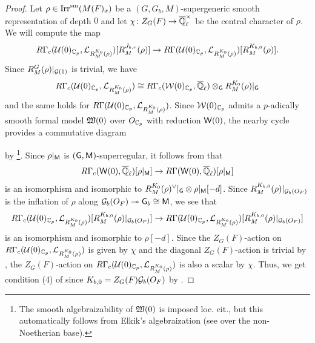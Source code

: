 \documentclass[12pt,reqno]{amsart}
\begin{document}
\begin{proof}
    Let $\rho \in {\operatorname{Irr}}^{\operatorname{sm}}(M(F)_x)$ be a $(G, G_b, M)$-supergeneric smooth representation of depth $0$ and let $\chi \colon Z_G(F) \to {\overline{\mathbb{Q}}_\ell^\times}$ be the central character of $\rho$. We will compute the map 
    \[
        R\Gamma_c({\mathcal{U}}(0)_{\mathbb{C}_p}, {\mathcal{L}}_{R^{K_0}_M(\rho)})[R^{J_{b, r}}_M(\rho)] \to R\Gamma({\mathcal{U}}(0)_{\mathbb{C}_p}, {\mathcal{L}}_{R^{K_0}_M(\rho)})[R^{K_{b, 0}}_M(\rho)]. 
    \]
    Since $R_M^G(\rho) \vert_{{\mathcal{G}}(1)}$ is trivial, we have 
    \[
        R\Gamma_c({\mathcal{U}}(0)_{\mathbb{C}_p}, {\mathcal{L}}_{R^{K_0}_M(\rho)}) \cong R\Gamma_c({\mathcal{W}}(0)_{\mathbb{C}_p}, {\overline{\mathbb{Q}}_\ell}) \otimes_{{\mathsf{G}}} R^{K_0}_M(\rho)\vert_{{\mathsf{G}}} 
    \]
    and the same holds for $R\Gamma({\mathcal{U}}(0)_{\mathbb{C}_p}, {\mathcal{L}}_{R^{K_0}_M(\rho)})$. Since ${\mathcal{W}}(0)_{\mathbb{C}_p}$ admits a $p$-adically smooth formal model ${\mathfrak{W}}(0)$ over $O_{\mathbb{C}_p}$ with reduction ${\mathsf{W}}(0)$, the nearby cycle provides a commutative diagram
    \begin{center}
    \end{center}
    by \cite[Lemma 4.5]{Tsu16}\footnote{The smooth algebraizability of ${\mathfrak{W}}(0)$ is imposed loc. cit., but this automatically follows from Elkik's algebraization (see \cite[footnote 6]{BS22} over the non-Noetherian base).}. Since $\rho\vert_{{\mathsf{M}}}$ is $({\mathsf{G}}, {\mathsf{M}})$-superregular, it follows from \cite[Théorème 11.7, B']{BR03} that 
    \[
        R\Gamma_c({\mathsf{W}}(0), {\overline{\mathbb{Q}}_\ell})\lbrack \rho\vert_{{\mathsf{M}}} \rbrack \to R\Gamma({\mathsf{W}}(0), {\overline{\mathbb{Q}}_\ell})\lbrack \rho\vert_{{\mathsf{M}}} \rbrack
    \]
    is an isomorphism and isomorphic to $R_M^{K_0}(\rho)^\vee\vert_{{\mathsf{G}}} \otimes \rho\vert_{{\mathsf{M}}}[-d]$. Since $R^{K_{b, 0}}_M(\rho) \vert_{{\mathcal{G}}_b(O_F)}$ is the inflation of $\rho$ along ${\mathcal{G}}_b(O_F) \twoheadrightarrow {\mathsf{G}}_b \cong {\mathsf{M}}$, we see that
    \[
        R\Gamma_c({\mathcal{U}}(0)_{\mathbb{C}_p}, {\mathcal{L}}_{R^{K_0}_M(\rho)})[R^{K_{b, 0}}_M(\rho) \vert_{{\mathcal{G}}_b(O_F)}] \to R\Gamma({\mathcal{U}}(0)_{\mathbb{C}_p}, {\mathcal{L}}_{R^{K_0}_M(\rho)})[R^{K_{b, 0}}_M(\rho) \vert_{{\mathcal{G}}_b(O_F)}]
    \]
    is an isomorphism and isomorphic to $\rho[-d]$. Since the $Z_G(F)$-action on $R\Gamma_c({\mathcal{U}}(0)_{\mathbb{C}_p}, {\mathcal{L}}_{R^{K_0}_M(\rho)})$ is given by $\chi$ and the diagonal $Z_G(F)$-action is trivial by , the $Z_G(F)$-action on $R\Gamma_c({\mathcal{U}}(0)_{\mathbb{C}_p}, {\mathcal{L}}_{R^{K_0}_M(\rho)})$ is also a scalar by $\chi$. Thus, we get condition (4) of  since $K_{b, 0} = Z_G(F) {\mathcal{G}}_b(O_F)$ by . 
\end{proof}
\end{document}
